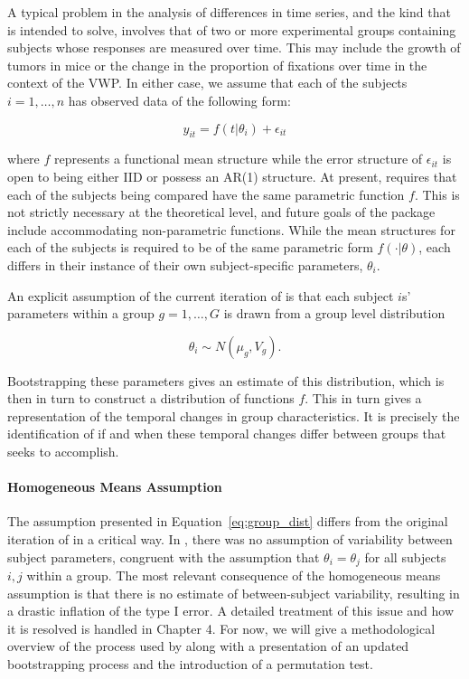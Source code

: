 A typical problem in the analysis of differences in time series, and the kind that  is intended to solve, involves that of two or more experimental groups containing subjects whose responses are measured over time. This may include the growth of tumors in  mice or the change in the proportion of fixations over time in the context of the VWP. In either case, we assume that each of the subjects $i = 1, \dots, n$  has observed data of the following form:

\begin{equation}\label{eq:mean_structure1}
y_{it} = f(t | \theta_i) + \epsilon_{it} 
\end{equation}


where $f$ represents a functional mean structure while the error structure of $\epsilon_{it}$ is open to being either IID or possess an AR(1) structure. At present,  requires that each of the subjects being compared have the same parametric function $f$. This is not strictly necessary at the theoretical level, and future goals of the package include accommodating non-parametric functions. While the mean structures for each of the subjects is required to be of the same parametric form $f(\cdot | \theta)$, each differs in their instance of their own subject-specific parameters, $\theta_i$.

An explicit assumption of the current iteration of  is that each subject $i$s' parameters within a group $g = 1, \dots, G$ is drawn from a group level distribution

\begin{equation}\label{eq:group_dist}
\theta_i \sim N(\mu_g, V_g).
\end{equation}

Bootstrapping these parameters gives an estimate of this distribution, which is then in turn to construct a distribution of functions $f$. This in turn gives a representation of the temporal changes in group characteristics. It is precisely the identification of if and when these temporal changes differ between groups that  seeks to accomplish.


\paragraph{Homogeneous Means Assumption}

The assumption presented in Equation~\ref{eq:group_dist} differs from the original iteration of  in a critical way. In \citet{oleson2017detecting}, there was no assumption of variability between subject parameters, congruent with the assumption that $\theta_i = \theta_j$ for all subjects $i, j$ within a group. The most relevant consequence of the homogeneous means assumption is that there is no estimate of between-subject variability, resulting in a drastic inflation of the type I error. A detailed treatment of this issue and how it is resolved is handled in Chapter 4. For now, we will give a methodological overview of the process used by  along with a presentation of an updated bootstrapping process and the introduction of a permutation test.




